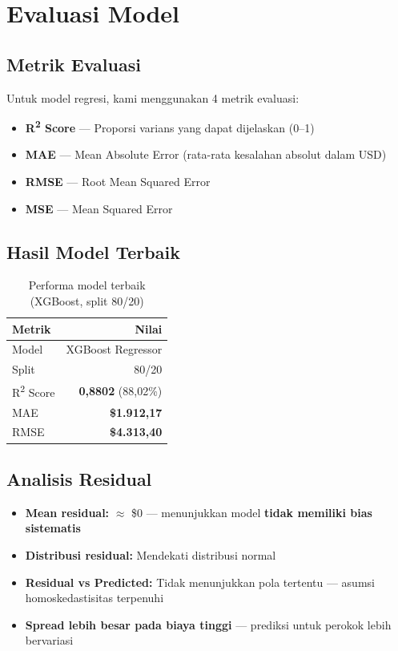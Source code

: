 \documentclass[12pt,a4paper]{article}
\begin{document}
\section{Evaluasi Model}

\subsection{Metrik Evaluasi}
Untuk model regresi, kami menggunakan 4 metrik evaluasi:
\begin{itemize}
    \item \textbf{R\textsuperscript{2} Score} — Proporsi varians yang dapat dijelaskan (0–1)
    \item \textbf{MAE} — Mean Absolute Error (rata-rata kesalahan absolut dalam USD)
    \item \textbf{RMSE} — Root Mean Squared Error
    \item \textbf{MSE} — Mean Squared Error
\end{itemize}

\subsection{Hasil Model Terbaik}

\begin{table}[h!]
\centering
\caption{Performa model terbaik (XGBoost, split 80/20)}
\begin{tabular}{lr}
\toprule
\textbf{Metrik} & \textbf{Nilai} \\
\midrule
Model            & XGBoost Regressor \\
Split            & 80/20 \\
R\textsuperscript{2} Score & \textbf{0,8802} (88,02\%) \\
MAE              & \textbf{\$1.912,17} \\
RMSE             & \textbf{\$4.313,40} \\
\bottomrule
\end{tabular}
\end{table}

\subsection{Analisis Residual}
\begin{itemize}
    \item \textbf{Mean residual:} $\approx$ \$0 — menunjukkan model \textbf{tidak memiliki bias sistematis}
    \item \textbf{Distribusi residual:} Mendekati distribusi normal
    \item \textbf{Residual vs Predicted:} Tidak menunjukkan pola tertentu — asumsi homoskedastisitas terpenuhi
    \item \textbf{Spread lebih besar pada biaya tinggi} — prediksi untuk perokok lebih bervariasi
\end{itemize}
\end{document}
